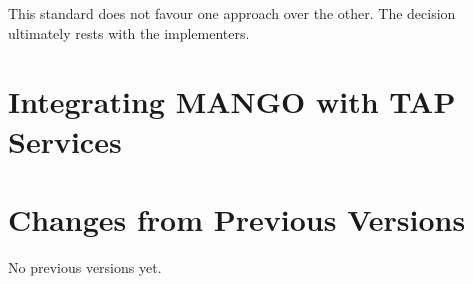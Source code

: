 \documentclass[11pt,a4paper]{ivoa}
\begin{document}
This standard does not favour one approach over the other.
The decision ultimately rests with the implementers.

%


\section{Integrating MANGO with TAP Services}


\pagebreak
\appendix

% 

% 

%

%

%

%

%

%

\section{Changes from Previous Versions}

No previous versions yet.



\end{document}
